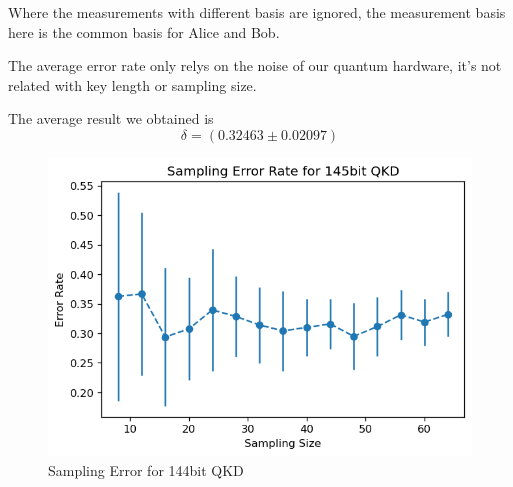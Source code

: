 \documentclass[11pt]{article}
\begin{document}


Where the measurements with different basis are ignored, the measurement basis here is the 
common basis for Alice and Bob. 

The average error rate only relys on the noise of our quantum hardware, 
it's not related with key length or sampling size.

The average result we obtained is 
\[
\delta=(0.32463\pm 0.02097)    
\]
\begin{figure}
    \centering
    \includegraphics[]{qkd145_error.png}
    \caption{Sampling Error for 144bit QKD}
\end{figure}
\end{document}
